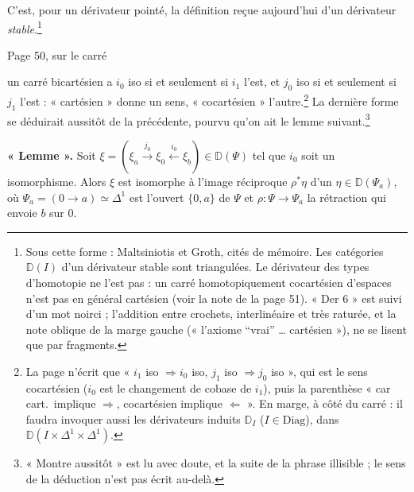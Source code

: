 \documentclass[11pt,a4paper]{article}
\begin{document}
C'est, pour un dérivateur pointé, la définition reçue aujourd'hui
d'un dérivateur \emph{stable}.\footnote{Sous cette forme : Maltsiniotis et
Groth, cités de mémoire. Les catégories $\mathbb D(I)$ d'un dérivateur stable
sont triangulées. Le dérivateur des types d'homotopie ne l'est pas : un carré
homotopiquement cocartésien d'espaces n'est pas en général cartésien (voir la
note de la page 51). « Der 6 » est suivi d'un mot noirci ; l'addition entre
crochets, interlinéaire et très raturée, et la note oblique de la marge
gauche (« l'axiome “vrai” … cartésien »), ne se lisent que par fragments.}

Page 50, sur le carré


un carré bicartésien a $i_0$ iso si et seulement si $i_1$ l'est, et $j_0$ iso
si et seulement si $j_1$ l'est : « cartésien » donne un sens, « cocartésien »
l'autre.\footnote{La page n'écrit que « $i_1$ iso $\Rightarrow i_0$ iso, $j_1$
iso $\Rightarrow j_0$ iso », qui est le sens cocartésien ($i_0$ est le
changement de cobase de $i_1$), puis la parenthèse « car cart.\ implique
$\Longrightarrow$, cocartésien implique $\Longleftarrow$ ». En marge, à côté du
carré : il faudra invoquer aussi les dérivateurs induits $\mathbb D_I$
($I \in \mathrm{Diag}$), dans $\mathbb D(I \times \Delta^1 \times \Delta^1)$.}
La dernière forme se déduirait aussitôt de la précédente, pourvu qu'on ait le
lemme suivant.\footnote{« Montre aussitôt » est lu avec doute, et la suite de
la phrase illisible ; le sens de la déduction n'est pas écrit au-delà.}

\textbf{« Lemme ».} Soit $\xi = (\xi_a \xrightarrow{j_0} \xi_0
\xleftarrow{i_0} \xi_b) \in \mathbb D(\Psi)$ tel que $i_0$ soit un
isomorphisme. Alors $\xi$ est isomorphe à l'image réciproque $\rho^*\eta$
d'un $\eta \in \mathbb D(\Psi_a)$, où $\Psi_a = (0 \to a)
\simeq \Delta^1$ est l'ouvert $\{0, a\}$ de $\Psi$ et $\rho : \Psi \to
\Psi_a$ la rétraction qui envoie $b$ sur $0$.
\end{document}
